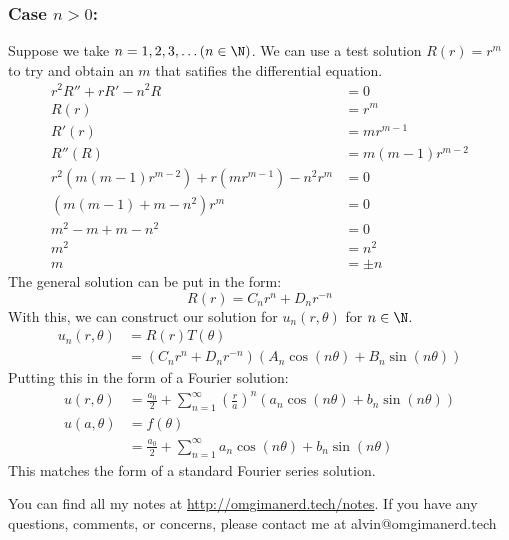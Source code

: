 \documentclass{math}
\begin{document}
\subsubsection*{Case \( n > 0 \):}
Suppose we take \( n = 1,2,3,\dots (n\in\N) \). We can use a test solution
\( R(r) = r^m \) to try and obtain an \( m \) that satifies the differential
equation.
\begin{align*}
  r^2R''+rR'-n^2R &= 0 \\
  R(r) &= r^m \\
  R'(r) &= mr^{m-1} \\
  R''(R) &= m(m-1)r^{m-2} \\
  r^2(m(m-1)r^{m-2})+r(mr^{m-1})-n^2r^m &= 0 \\
  (m(m-1)+m-n^2)r^m &= 0 \\
  m^2-m+m-n^2 &= 0 \\
  m^2 &= n^2 \\
  m &= \pm n
\end{align*}
The general solution can be put in the form:
\[ R(r) = C_nr^n+D_nr^{-n} \]
With this, we can construct our solution for \( u_n(r,\theta) \) for
\( n\in\N \).
\begin{align*}
  u_n(r,\theta) &= R(r)T(\theta) \\
  &= (C_nr^n+D_nr^{-n})(A_n\cos(n\theta)+B_n\sin(n\theta))
\end{align*}
Putting this in the form of a Fourier solution:
\begin{align*}
  u(r,\theta) &= \frac{a_0}{2}+\sum_{n=1}^{\infty}(\frac{r}{a})^n
    (a_n\cos(n\theta)+b_n\sin(n\theta)) \\
  u(a,\theta) &= f(\theta) \\
  &= \frac{a_0}{2}+\sum_{n=1}^{\infty}a_n\cos(n\theta)+b_n\sin(n\theta)
\end{align*}
This matches the form of a standard Fourier series solution.

\begin{center}
  You can find all my notes at \url{http://omgimanerd.tech/notes}. If you have
  any questions, comments, or concerns, please contact me at
  alvin@omgimanerd.tech
\end{center}
\end{document}
